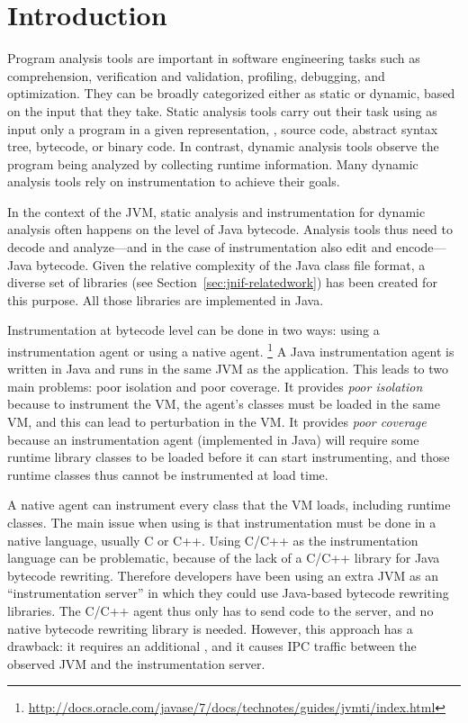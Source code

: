 \section{Introduction}\label{sec:jnif-introduction}

Program analysis tools are important in software engineering tasks 
such as comprehension, verification and validation, profiling, debugging, and optimization.
They can be broadly categorized either as static or dynamic,
based on the input that they take.
Static analysis tools carry out their task using as input only a program
in a given representation, \eg{}, source code, abstract syntax tree,
bytecode, or binary code.
In contrast, dynamic analysis tools observe the program being analyzed 
by collecting runtime information.
Many dynamic analysis tools rely on instrumentation to achieve their goals.

In the context of the JVM, 
static analysis and instrumentation for dynamic analysis often happens on the level of Java bytecode.
Analysis tools thus need to decode and analyze---and in the case of instrumentation also edit and encode---Java bytecode.
Given the relative complexity of the Java class file format,
a diverse set of libraries (see Section~\ref{sec:jnif-relatedwork}) has been created for this purpose.
All those libraries are implemented in Java.

Instrumentation at bytecode level can be done in two ways:
using a \java{} instrumentation agent or using a native \jvmti{} agent.%
\footnote{\url{http://docs.oracle.com/javase/7/docs/technotes/guides/jvmti/index.html}}
A Java instrumentation agent is written in Java and runs in the same JVM as the application.
This leads to two main problems: poor isolation and poor coverage.
It provides \emph{poor isolation} because to instrument the VM, 
the agent's classes must be loaded in the same VM,
and this can lead to perturbation in the VM.
It provides \emph{poor coverage} because 
an instrumentation agent (implemented in Java) will require some runtime library classes to be loaded before it can start instrumenting,
and those runtime classes thus cannot be instrumented at load time. 

A native \jvmti{} agent can instrument every class that the VM loads, including runtime classes. 
The main issue when using \jvmti{} is that instrumentation must be done in a native language, usually C or C++. 
Using C/C++ as the instrumentation language can be problematic, 
because of the lack of a C/C++ library for Java bytecode rewriting. 
Therefore developers have been using an extra JVM as an ``instrumentation server''
in which they could use Java-based bytecode rewriting libraries.
The C/C++ \jvmti{} agent thus only has to send code to the server,
and no native bytecode rewriting library is needed.
However, this approach has a drawback: it requires an additional \jvm{}, 
and it causes IPC traffic between the observed JVM and the instrumentation server.

